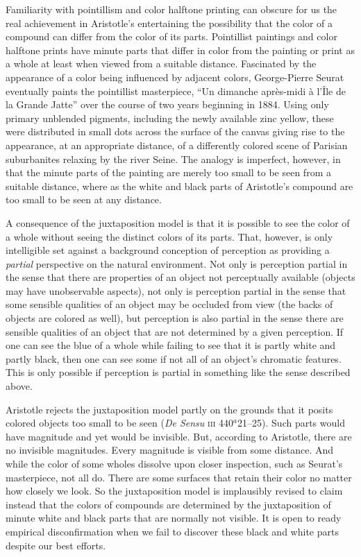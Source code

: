 Familiarity with pointillism and color halftone printing can obscure for us the real achievement in Aristotle's entertaining the possibility that the color of a compound can differ from the color of its parts. Pointillist paintings and color halftone prints have minute parts that differ in color from the painting or print as a whole at least when viewed from a suitable distance. Fascinated by the appearance of a color being influenced by adjacent colors, George-Pierre Seurat eventually paints the pointillist masterpiece, ``Un dimanche apr\`es-midi \`a l'\^Ile de la Grande Jatte'' over the course of two years beginning in 1884. Using only primary unblended pigments, including the newly available zinc yellow, these were distributed in small dots across the surface of the canvas giving rise to the appearance, at an appropriate distance, of a differently colored scene of Parisian suburbanites relaxing by the river Seine. The analogy is imperfect, however, in that the minute parts of the painting are merely too small to be seen from a suitable distance, where as the white and black parts of Aristotle's compound are too small to be seen at any distance.

A consequence of the juxtaposition model is that it is possible to see the color of a whole without seeing the distinct colors of its parts. That, however, is only intelligible set against a background conception of perception as providing a \emph{partial} perspective on the natural environment. Not only is perception partial in the sense that there are properties of an object not perceptually available (objects may have unobservable aspects), not only is perception partial in the sense that some sensible qualities of an object may be occluded from view (the backs of objects are colored as well), but perception is also partial in the sense there are sensible qualities of an object that are not determined by a given perception. If one can see the blue of a whole while failing to see that it is partly white and partly black, then one can see some if not all of an object's chromatic features. This is only possible if perception is partial in something like the sense described above. 

Aristotle rejects the juxtaposition model partly on the grounds that it posits colored objects too small to be seen (\emph{De Sensu} \textsc{iii} 440\( ^{a} \)21--25). Such parts would have magnitude and yet would be invisible. But, according to Aristotle, there are no invisible magnitudes. Every magnitude is visible from some distance. And while the color of some wholes dissolve upon closer inspection, such as Seurat's masterpiece, not all do. There are some surfaces that retain their color no matter how closely we look. So the juxtaposition model is implausibly revised to claim instead that the colors of compounds are determined by the juxtaposition of minute white and black parts that are normally not visible. It is open to ready empirical disconfirmation when we fail to discover these black and white parts despite our best efforts. \change

